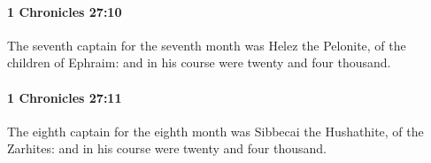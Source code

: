 		\paragraph{1 Chronicles 27:10} %
			\label{1CHRONICLES-27-10}

			The seventh captain for the seventh month was Helez the Pelonite, of the children of Ephraim: and in his course were twenty and four thousand.


		\paragraph{1 Chronicles 27:11} %
			\label{1CHRONICLES-27-11}

			The eighth captain for the eighth month was Sibbecai the Hushathite, of the Zarhites: and in his course were twenty and four thousand.


